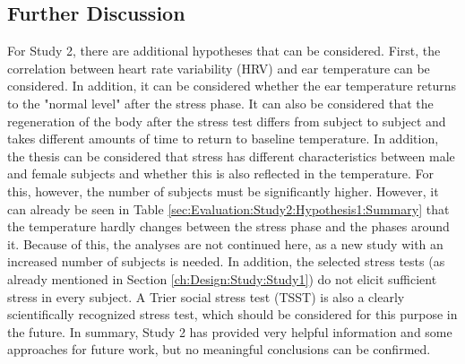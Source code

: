 \subsection{Further Discussion}
For Study 2, there are additional hypotheses that can be considered. 
First, the correlation between heart rate variability (HRV) and ear temperature can be considered. 
In addition, it can be considered whether the ear temperature returns to the "normal level" after the stress phase.
It can also be considered that the regeneration of the body after the stress test differs from subject to subject and takes different amounts of time to return to baseline temperature.
In addition, the thesis can be considered that stress has different characteristics between male and female subjects and whether this is also reflected in the temperature.
For this, however, the number of subjects must be significantly higher.
However, it can already be seen in Table \ref{sec:Evaluation:Study2:Hypothesis1:Summary} that the temperature hardly changes between the stress phase and the phases around it. 
Because of this, the analyses are not continued here, as a new study with an increased number of subjects is needed.
In addition, the selected stress tests (as already mentioned in Section \ref{ch:Design:Study:Study1}) do not elicit sufficient stress in every subject.
A Trier social stress test (TSST) is also a clearly scientifically recognized stress test, which should be considered for this purpose in the future.
In summary, Study 2 has provided very helpful information and some approaches for future work, but no meaningful conclusions can be confirmed.